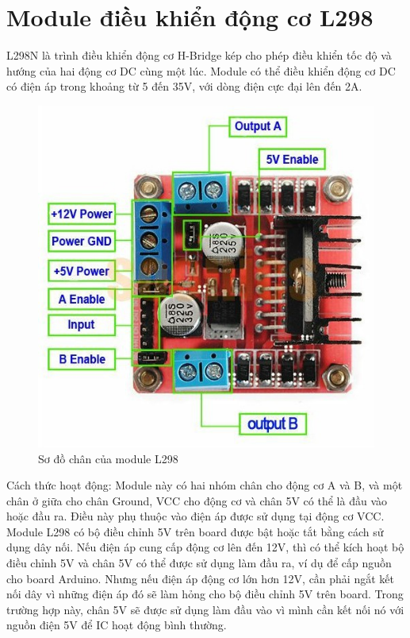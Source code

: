 \documentclass[../DoAn.tex]{subfiles}
\begin{document}
\section{Module điều khiển động cơ L298}
\label{section:3.5}

L298N là trình điều khiển động cơ H-Bridge kép cho phép điều khiển tốc độ và hướng của hai động cơ DC cùng một lúc. Module có thể điều khiển động cơ DC có điện áp trong khoảng từ 5 đến 35V, với dòng điện cực đại lên đến 2A.

\begin{figure}[H]
    \includegraphics[scale = 0.6]{Hinhve/L298.jpg}
    \centering
    \caption{Sơ đồ chân của module L298}
\end{figure}

Cách thức hoạt động: Module này có hai nhóm chân cho động cơ A và B, và một chân ở giữa cho chân Ground, VCC cho động cơ và chân 5V có thể là đầu vào hoặc đầu ra. Điều này phụ thuộc vào điện áp được sử dụng tại động cơ VCC. Module L298 có bộ điều chỉnh 5V trên board được bật hoặc tắt bằng cách sử dụng dây nối. Nếu điện áp cung cấp động cơ lên đến 12V, thì có thể kích hoạt bộ điều chỉnh 5V và chân 5V có thể được sử dụng làm đầu ra, ví dụ để cấp nguồn cho board Arduino. Nhưng nếu điện áp động cơ lớn hơn 12V, cần phải ngắt kết nối dây vì những điện áp đó sẽ làm hỏng cho bộ điều chỉnh 5V trên board. Trong trường hợp này, chân 5V sẽ được sử dụng làm đầu vào vì mình cần kết nối nó với nguồn điện 5V để IC hoạt động bình thường.
\end{document}
